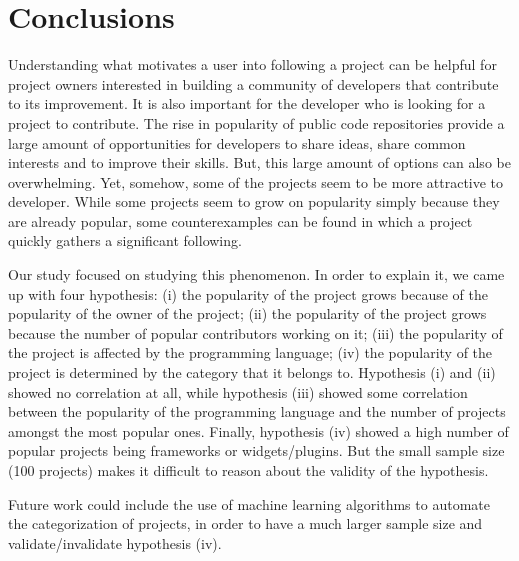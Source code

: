 
\section{Conclusions}
\label{sec:conclusions}

Understanding what motivates a user into following a project can be helpful for project owners interested in building a community of developers that contribute to its improvement. It is also important for the developer who is looking for a project to contribute. The rise in popularity of public code repositories provide a large amount of opportunities for developers to share ideas, share common interests and to improve their skills. But, this large amount of options can also be overwhelming. Yet, somehow, some of the projects seem to be more attractive to developer. While some projects seem to grow on popularity simply because they are already popular, some counterexamples can be found in which a project quickly gathers a significant following.

Our study focused on studying this phenomenon. In order to explain it, we came up with four hypothesis: (i) the popularity of the project grows because of the popularity of the owner of the project; (ii) the popularity of the project grows because the number of popular contributors working on it; (iii) the popularity of the project is affected by the programming language; (iv) the popularity of the project is determined by the category that it belongs to. Hypothesis (i) and (ii) showed no correlation at all, while hypothesis (iii) showed some correlation between the popularity of the programming language and the number of projects amongst the most popular ones. Finally, hypothesis (iv) showed a high number of popular projects being frameworks or widgets/plugins. But the small sample size (100 projects) makes it difficult to reason about the validity of the hypothesis.

Future work could include the use of machine learning algorithms to automate the categorization of projects, in order to have a much larger sample size and validate/invalidate hypothesis (iv).